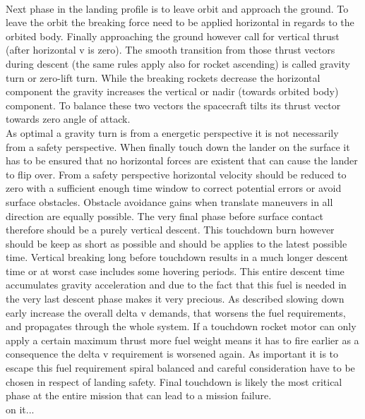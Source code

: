 \\
Next phase in the landing profile is to leave orbit and approach the ground. To leave the orbit the breaking force need to be applied horizontal in regards to the orbited body. Finally approaching the ground however call for vertical thrust (after horizontal v is zero). The smooth transition from those thrust vectors during descent (the same rules apply also for rocket ascending)  is called gravity turn or zero-lift turn. While the breaking rockets decrease the horizontal component the gravity increases the vertical or nadir (towards orbited body) component. To balance these two vectors the spacecraft tilts its thrust vector towards zero angle of attack.\\
As optimal a gravity turn is from a energetic perspective it is not necessarily from a safety perspective. When finally touch down the lander on the surface it has to be ensured that no horizontal forces are existent that can cause the lander to flip over. From a safety perspective horizontal velocity should be reduced to zero with a sufficient enough time window to correct potential errors or avoid surface obstacles. Obstacle avoidance gains when translate maneuvers in all direction are equally possible. The very final phase before surface contact therefore should be a purely vertical descent. This touchdown burn however should be keep as short as possible and should be applies to the latest possible time. Vertical breaking long before touchdown results in a much longer descent time or at worst case includes some hovering periods. This entire descent time accumulates gravity acceleration and due to the fact that this fuel is needed in the very last descent phase makes it very precious. As described slowing down early increase the overall delta v demands, that worsens the fuel requirements, and propagates through the whole system. If a touchdown rocket motor can only apply a certain maximum thrust more fuel weight means it has to fire earlier as a consequence the delta v requirement is worsened again. As important it is to escape this fuel requirement spiral balanced and careful consideration have to be chosen in respect of landing safety. Final touchdown is likely the most critical phase at the entire mission that can lead to a mission failure.\\

on it...